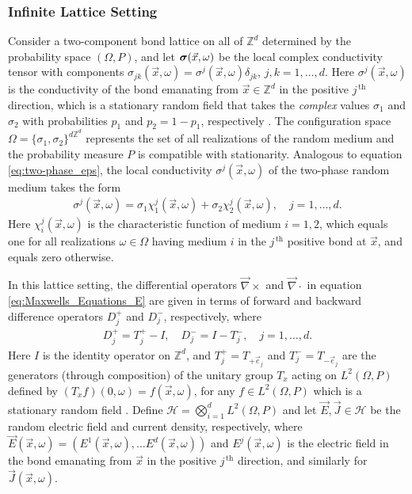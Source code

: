 \documentclass{cmslatex}
\newcommand\bsig{\mbox{\boldmath${\sigma}$}}
\begin{document}
\subsubsection{Infinite Lattice Setting}
\label{sec:Infinite_Lattice_Setting}
%
Consider a two-component bond lattice on all of $\mathbb{Z}^d$
determined by the probability space $(\Omega,P)$, and let
$\bsig(\vec{x},\omega)$ be the local complex conductivity tensor with
components $\sigma_{jk}(\vec{x},\omega)=\sigma^j(\vec{x},\omega)\delta_{jk}$, $j,k=1,\ldots,d$. Here
$\sigma^j(\vec{x},\omega)$ is the conductivity of the bond emanating from 
$\vec{x}\in\mathbb{Z}^d$ in the positive $j^{\,\text{th}}$ direction, 
which is a stationary random field that takes the \emph{complex} values
$\sigma_1$ and $\sigma_2$ with probabilities $p_1$ and $p_2=1-p_1$,
respectively \cite{Golden:CMP-467,Bruno:JSP-365}. The configuration
space $\Omega=\{\sigma_1,\sigma_2\}^{d\mathbb{Z}^d}$ represents the set of all
realizations of the random medium and the 
probability measure $P$ is compatible with stationarity. Analogous to equation
\eqref{eq:two-phase_eps}, the local conductivity $\sigma^j(\vec{x},\omega)$ of
the two-phase random medium takes the form \cite{Golden:CMP-467}
%
\begin{align}\label{eq:two-phase_sigma}
  \sigma^j(\vec{x},\omega)=\sigma_1\chi_1^j(\vec{x},\omega)+\sigma_2\chi_2^j(\vec{x},\omega), \quad j=1,\ldots,d.
\end{align}
%
Here $\chi_i^j(\vec{x},\omega)$ is the characteristic function of medium
$i=1,2$, which equals one for all realizations $\omega\in\Omega$ having medium $i$
in the $j^{\,\text{th}}$ positive bond at $\vec{x}$, and equals zero
otherwise.




In this lattice setting, the differential operators $\vec{\nabla}\times$ and
$\vec{\nabla}\cdot$ in equation \eqref{eq:Maxwells_Equations_E} are given 
\cite{Golden:CMP-467,Bruno:JSP-365} in terms of forward and backward
difference operators $D_j^+$ and $D_j^-$, respectively, where
%
\begin{align}\label{eq:Difference_Operators}
  D_j^+=T_j^+-I, \quad D_j^-=I-T_j^-, \quad j=1,\ldots,d.
\end{align}
%
Here $I$ is the identity operator on $\mathbb{Z}^d$, and 
$T_j^+=T_{+\vec{e}_j}$ and $T_j^-=T_{-\vec{e}_j}$ are the generators (through 
composition) of the unitary group $T_x$ acting on $L^2(\Omega,P)$ defined
by $(T_xf)(0,\omega)=f(\vec{x},\omega)$, for any $f\in L^2(\Omega,P)$
which is a stationary random field
\cite{Golden:CMP-467}. Define $\mathscr{H}=\bigotimes_{i=1}^dL^2(\Omega,P)$ and let
$\vec{E},\vec{J}\in \mathscr{H}$ be  
the random electric field and current density,
respectively, where $\vec{E}(\vec{x},\omega)=(E^1(\vec{x},\omega),\ldots
E^d(\vec{x},\omega))$ and $E^j(\vec{x},\omega)$ is the electric field in the
bond emanating from $\vec{x}$ in the positive $j^{\,\text{th}}$
direction, and similarly for $\vec{J}(\vec{x},\omega)$. 
\end{document}
